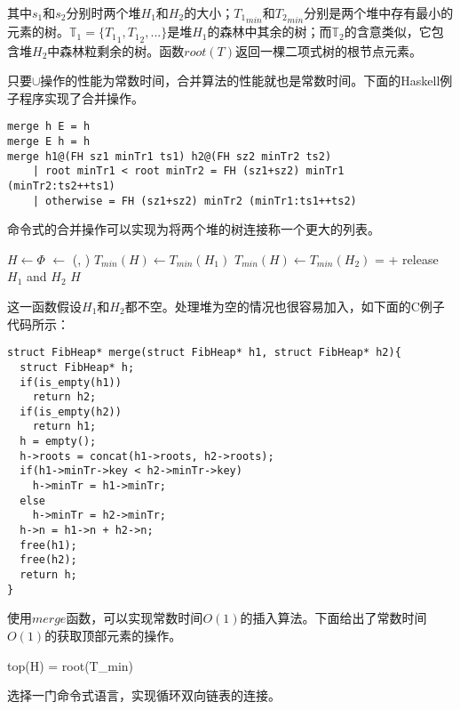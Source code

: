 \documentclass[UTF8]{article}
\begin{document}
其中$s_1$和$s_2$分别时两个堆$H_1$和$H_2$的大小；${T_1}_{min}$和${T_2}_{min}$分别是两个堆中存有最小的元素的树。$\mathbb{T}_1 = \{{T_1}_1, {T_1}_2, ...\}$是堆$H_1$的森林中其余的树；而$\mathbb{T}_2$的含意类似，它包含堆$H_2$中森林粒剩余的树。函数$root(T)$返回一棵二项式树的根节点元素。

只要$\cup$操作的性能为常数时间，合并算法的性能就也是常数时间。下面的Haskell例子程序实现了合并操作。

\lstset{language=Haskell}
\begin{lstlisting}
merge h E = h
merge E h = h
merge h1@(FH sz1 minTr1 ts1) h2@(FH sz2 minTr2 ts2)
    | root minTr1 < root minTr2 = FH (sz1+sz2) minTr1 (minTr2:ts2++ts1)
    | otherwise = FH (sz1+sz2) minTr2 (minTr1:ts1++ts2)
\end{lstlisting}

命令式的合并操作可以实现为将两个堆的树连接称一个更大的列表。

\begin{algorithmic}[1]
  \State $H \gets \Phi$
  \State {} $\gets$ (, )
    \State $T_{min}(H) \gets T_{min}(H_1)$
  \Else
    \State $T_{min}(H) \gets T_{min}(H_2)$
  \EndIf
   =  + 
  \State release $H_1$ and $H_2$
  \State \Return $H$
\EndFunction
\end{algorithmic}

这一函数假设$H_1$和$H_2$都不空。处理堆为空的情况也很容易加入，如下面的C例子代码所示：

\lstset{language=C}
\begin{lstlisting}
struct FibHeap* merge(struct FibHeap* h1, struct FibHeap* h2){
  struct FibHeap* h;
  if(is_empty(h1))
    return h2;
  if(is_empty(h2))
    return h1;
  h = empty();
  h->roots = concat(h1->roots, h2->roots);
  if(h1->minTr->key < h2->minTr->key)
    h->minTr = h1->minTr;
  else
    h->minTr = h2->minTr;
  h->n = h1->n + h2->n;
  free(h1);
  free(h2);
  return h;
}
\end{lstlisting}

使用$merge$函数，可以实现常数时间$O(1)$的插入算法。下面给出了常数时间$O(1)$的获取顶部元素的操作。

\be
top(H) = root(T_{min})
\ee

\begin{Exercise}
选择一门命令式语言，实现循环双向链表的连接。
\end{Exercise}
\end{document}
